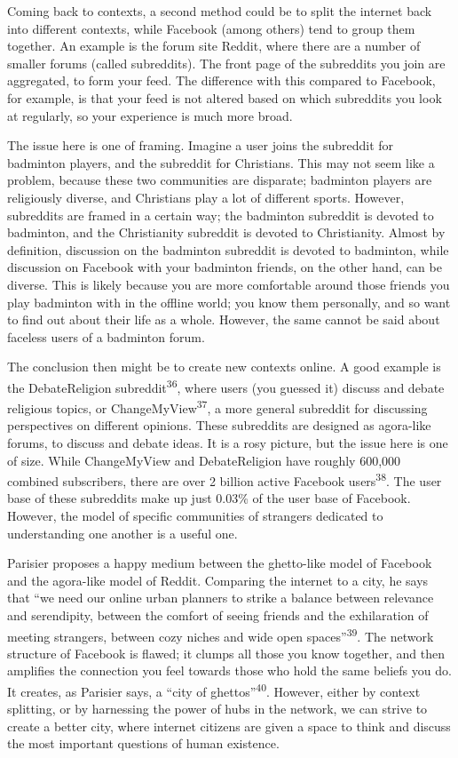 \documentclass[]{article}
\begin{document}
Coming back to contexts, a second method could be to split the internet
back into different contexts, while Facebook (among others) tend to
group them together. An example is the forum site Reddit, where there
are a number of smaller forums (called subreddits). The front page of
the subreddits you join are aggregated, to form your feed. The
difference with this compared to Facebook, for example, is that your
feed is not altered based on which subreddits you look at regularly, so
your experience is much more broad.

The issue here is one of framing. Imagine a user joins the subreddit for
badminton players, and the subreddit for Christians. This may not seem
like a problem, because these two communities are disparate; badminton
players are religiously diverse, and Christians play a lot of different
sports. However, subreddits are framed in a certain way; the badminton
subreddit is devoted to badminton, and the Christianity subreddit is
devoted to Christianity. Almost by definition, discussion on the
badminton subreddit is devoted to badminton, while discussion on
Facebook with your badminton friends, on the other hand, can be diverse.
This is likely because you are more comfortable around those friends you
play badminton with in the offline world; you know them personally, and
so want to find out about their life as a whole. However, the same
cannot be said about faceless users of a badminton forum.

The conclusion then might be to create new contexts online. A good
example is the DebateReligion subreddit\textsuperscript{36}, where users
(you guessed it) discuss and debate religious topics, or
ChangeMyView\textsuperscript{37}, a more general subreddit for
discussing perspectives on different opinions. These subreddits are
designed as agora-like forums, to discuss and debate ideas. It is a rosy
picture, but the issue here is one of size. While ChangeMyView and
DebateReligion have roughly 600,000 combined subscribers, there are over
2 billion active Facebook users\textsuperscript{38}. The user base of
these subreddits make up just 0.03\% of the user base of Facebook.
However, the model of specific communities of strangers dedicated to
understanding one another is a useful one.

Parisier proposes a happy medium between the ghetto-like model of
Facebook and the agora-like model of Reddit. Comparing the internet to a
city, he says that ``we need our online urban planners to strike a
balance between relevance and serendipity, between the comfort of seeing
friends and the exhilaration of meeting strangers, between cozy niches
and wide open spaces''\textsuperscript{39}. The network structure of
Facebook is flawed; it clumps all those you know together, and then
amplifies the connection you feel towards those who hold the same
beliefs you do. It creates, as Parisier says, a ``city of
ghettos''\textsuperscript{40}. However, either by context splitting, or
by harnessing the power of hubs in the network, we can strive to create
a better city, where internet citizens are given a space to think and
discuss the most important questions of human existence.
\end{document}
